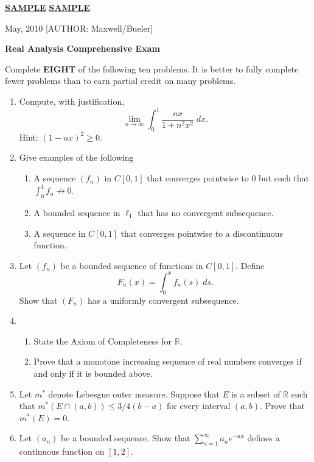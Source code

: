 \documentclass[12pt]{article}
\def\ra{\rightarrow}
\def\Reals{{\mathbb R}}
\begin{document}
\thispagestyle{empty}
\Large \noindent \underline{\textbf{SAMPLE}} \hfill\underline{\textbf{SAMPLE}}

\scriptsize {} May, 2010  \hfill  \tiny [AUTHOR: Maxwell/Bueler]
\normalsize\bigskip

\centerline{\large\textbf{Real Analysis Comprehensive Exam}} 
\bigskip

Complete {\bf EIGHT} of the following ten problems.  It is better to fully
complete fewer problems than to earn partial credit on many problems.
\bigskip
\begin{enumerate}

\item Compute, with justification, 
$$
\lim_{n\ra\infty} \int_0^1 \frac{nx}{1+n^2x^2}\; dx.
$$
Hint:  $(1-nx)^2 \ge 0$.

\item Give examples of the following
\begin{enumerate}
	\item A sequence $(f_n)$ in $C[0,1]$ that converges pointwise to $0$
	 but such that $\int_0^1 f_n\not\ra 0$.  
	\item A bounded sequence in $\ell_1$ that has no convergent subsequence.
	\item A sequence in $C[0,1]$ that converges pointwise to a discontinuous function.
\end{enumerate}	

\item Let $(f_n)$ be a bounded sequence of functions in $C[0,1]$.
Define
$$
F_n(x) = \int_0^x f_n(s)\; ds.
$$
Show that $(F_n)$ has a uniformly convergent subsequence.

\item 
\begin{enumerate}
	\item State the Axiom of Completeness for $\Reals$.
	\item Prove that a monotone increasing sequence of real numbers converges if and only
	if it is bounded above.
\end{enumerate}

\item Let $m^*$ denote Lebesgue outer measure.  Suppose that $E$ is a subset of $\Reals$
such that $m^*(E\cap (a,b)) \le 3/4 (b-a)$ for every interval $(a,b)$. Prove that
$m^*(E)=0$.

\item Let $(a_n)$ be a bounded sequence.  Show that $\sum_{n=1}^\infty a_n e^{-nx}$
defines a continuous function on $[1,2]$.


\end{enumerate}
\end{document}
